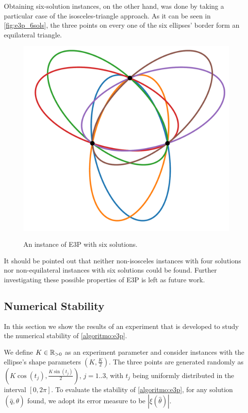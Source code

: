 Obtaining six-solution instances, on the other hand, was done by taking a particular case of the isosceles-triangle approach.
As it can be seen in \autoref{fig:e3p_6sols}, the three points on every one of the six ellipses' border form an equilateral triangle. 

\begin{figure}[H]
	\centering
	\caption{An instance of E3P with six solutions.}
	\includegraphics[scale=.35]{tex/figures/e3p_6sols}
	\fautor
	\label{fig:e3p_6sols}
\end{figure}

It should be pointed out that neither non-isosceles instances with four solutions nor non-equilateral instances with six solutions could be found. Further investigating these possible properties of E3P is left as future work.


\subsection{Numerical Stability}

In this section we show the results of an experiment that is developed to study the numerical stability of \autoref{algoritmo:e3p}. 

We define $K\in\mathbb{R}_{>0}$ as an experiment parameter and consider instances with the ellipse's shape parameters $(K, \frac{K}{2})$. The three points are generated randomly as $(K\cos(t_j), \frac{K\sin{(t_j)}}{2})$, $j=1..3$, with $t_j$ being uniformly distributed in the interval $[0, 2\pi]$.
To evaluate the stability of \autoref{algoritmo:e3p}, for any solution $(\hat{q}, \hat{\theta})$ found, we adopt its error measure to be $|\xi(\hat{\theta})|$.

